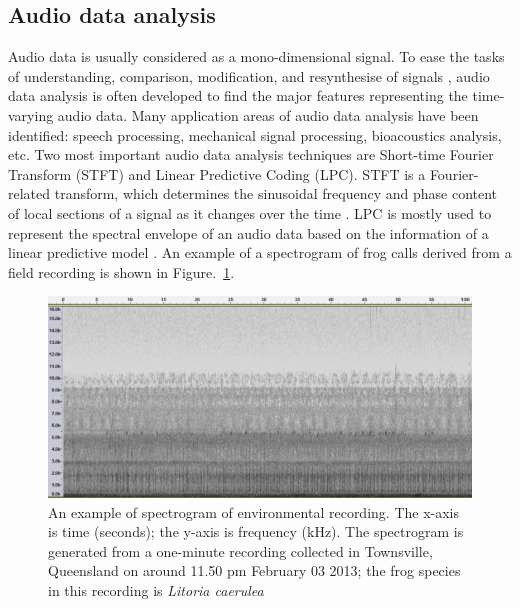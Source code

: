 \subsection{Audio data analysis}
Audio data is usually considered as a mono-dimensional signal. To ease the tasks of understanding, comparison, modification, and resynthesise of signals \citep{rocchesso2003introduction}, audio data analysis is often developed to find the major features representing the time-varying audio data. Many application areas of audio data analysis have been identified: speech processing, mechanical signal processing, bioacoustics analysis, etc. Two most important audio data analysis techniques are Short-time Fourier Transform (STFT) and Linear Predictive Coding (LPC). STFT is a Fourier-related transform, which determines the sinusoidal frequency and phase content of local sections of a signal as it changes over the time \citep{allen1997short}. LPC is mostly used to represent the spectral envelope of an audio data based on the information of a linear predictive model \citep{deng2003speech}. An example of a spectrogram of frog calls derived from a field recording is shown in Figure.~\ref{fig:Ch1_spectrogram}.

\begin{figure}[htb!]
\centering
\includegraphics[width=\textwidth]{image/Ch1/spectrogram_example.png}
\caption[An example of spectrogram of environmental recording]{An example of spectrogram of environmental recording. The x-axis is time (seconds); the y-axis is frequency (kHz). The spectrogram is generated from a one-minute recording collected in Townsville, Queensland on around 11.50 pm February 03 2013; the frog species in this recording is \textit{Litoria caerulea}}
\label{fig:Ch1_spectrogram}
\end{figure}





